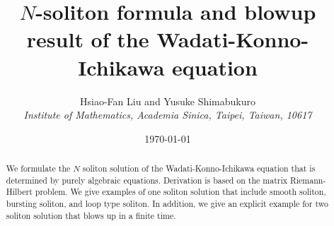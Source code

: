 \documentclass[11pt]{article}
\begin{document}
\title{$N$-soliton formula and blowup result of the Wadati-Konno-Ichikawa equation}

\author{Hsiao-Fan Liu and Yusuke Shimabukuro\\
{\small \it Institute of Mathematics, Academia Sinica, Taipei, Taiwan, 10617} \\
}

\date{\today}
\maketitle

\begin{abstract}
We formulate the $N$ soliton solution of the Wadati-Konno-Ichikawa equation that is determined by purely algebraic equations. Derivation is based on the matrix Riemann-Hilbert problem. We give examples of one soliton solution that include smooth soliton, bursting soliton, and loop type soliton. In addition, we give an explicit example for two soliton solution that blows up in a finite time.
\end{abstract}
\end{document}
